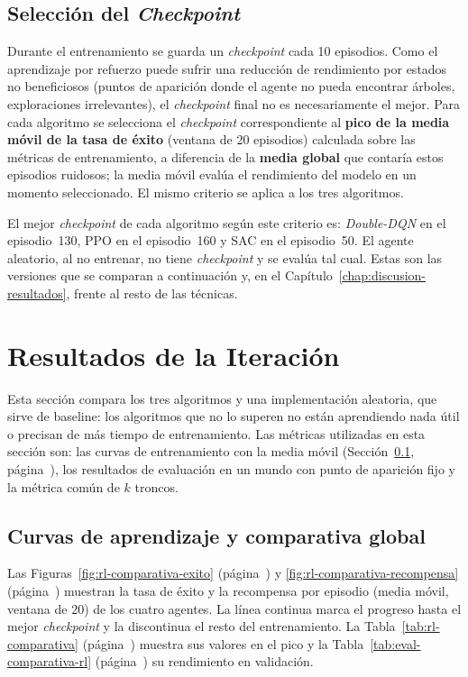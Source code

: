 \subsection{Selección del \textit{Checkpoint}}
\label{sec:rl-ckpt}
Durante el entrenamiento se guarda un \textit{\gls{checkpoint}} cada \num{10} episodios. Como el
aprendizaje por refuerzo puede sufrir una reducción de rendimiento por estados no beneficiosos (puntos de aparición
donde el agente no pueda encontrar árboles, exploraciones irrelevantes), el \textit{checkpoint} final no es necesariamente el mejor.
Para cada algoritmo se selecciona el \textit{checkpoint} correspondiente al \textbf{pico de la media
móvil de la tasa de éxito} (ventana de \num{20} episodios) calculada sobre las métricas de
entrenamiento, a diferencia de la \textbf{media global} que contaría estos episodios ruidosos;
la media móvil evalúa el rendimiento del modelo en un momento seleccionado. 
El mismo criterio se aplica a los tres algoritmos.

El mejor \textit{checkpoint} de cada algoritmo según este criterio es: \textit{Double-DQN} en el
episodio~\num{130}, PPO en el episodio~\num{160} y SAC en el episodio~\num{50}. El agente aleatorio,
al no entrenar, no tiene \textit{checkpoint} y se evalúa tal cual. Estas son las versiones que se
comparan a continuación y, en el Capítulo~\ref{chap:discusion-resultados}, frente al resto de
las técnicas.

\section{Resultados de la Iteración}
\label{sec:rl-resultados}
Esta sección compara los tres algoritmos y una implementación aleatoria,
que sirve de \gls{baseline}: los algoritmos que no lo superen no están aprendiendo nada
útil o precisan de más tiempo de entrenamiento. 
Las métricas utilizadas en esta sección son: las
curvas de entrenamiento con la media móvil
(Sección~\ref{sec:rl-ckpt}, página~\pageref{sec:rl-ckpt}), los resultados de evaluación en un mundo
con punto de aparición fijo y la métrica común de $k$ troncos.

\subsection{Curvas de aprendizaje y comparativa global}
Las Figuras~\ref{fig:rl-comparativa-exito} (página~\pageref{fig:rl-comparativa-exito})
y \ref{fig:rl-comparativa-recompensa} (página~\pageref{fig:rl-comparativa-recompensa}) muestran
la tasa de éxito y la recompensa por episodio (media móvil, ventana de \num{20}) de los cuatro
agentes. La línea continua marca el progreso hasta el mejor \textit{checkpoint} y la discontinua el resto del
entrenamiento. La Tabla~\ref{tab:rl-comparativa} (página~\pageref{tab:rl-comparativa}) muestra sus valores en el pico
y la Tabla~\ref{tab:eval-comparativa-rl} (página~\pageref{tab:eval-comparativa-rl}) su rendimiento en validación.

